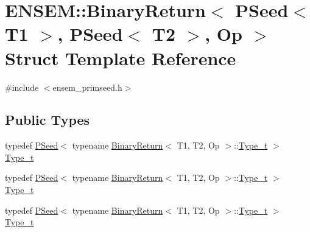 \hypertarget{structENSEM_1_1BinaryReturn_3_01PSeed_3_01T1_01_4_00_01PSeed_3_01T2_01_4_00_01Op_01_4}{}\section{E\+N\+S\+EM\+:\+:Binary\+Return$<$ P\+Seed$<$ T1 $>$, P\+Seed$<$ T2 $>$, Op $>$ Struct Template Reference}
\label{structENSEM_1_1BinaryReturn_3_01PSeed_3_01T1_01_4_00_01PSeed_3_01T2_01_4_00_01Op_01_4}


{\ttfamily \#include $<$ensem\+\_\+primseed.\+h$>$}

\subsection*{Public Types}
\begin{DoxyCompactItemize}
\item 
typedef \mbox{\hyperlink{classENSEM_1_1PSeed}{P\+Seed}}$<$ typename \mbox{\hyperlink{structENSEM_1_1BinaryReturn}{Binary\+Return}}$<$ T1, T2, Op $>$\+::\mbox{\hyperlink{structENSEM_1_1BinaryReturn_3_01PSeed_3_01T1_01_4_00_01PSeed_3_01T2_01_4_00_01Op_01_4_ae3a30c4b21f95d0ccf2ef57c02e76dcb}{Type\+\_\+t}} $>$ \mbox{\hyperlink{structENSEM_1_1BinaryReturn_3_01PSeed_3_01T1_01_4_00_01PSeed_3_01T2_01_4_00_01Op_01_4_ae3a30c4b21f95d0ccf2ef57c02e76dcb}{Type\+\_\+t}}
\item 
typedef \mbox{\hyperlink{classENSEM_1_1PSeed}{P\+Seed}}$<$ typename \mbox{\hyperlink{structENSEM_1_1BinaryReturn}{Binary\+Return}}$<$ T1, T2, Op $>$\+::\mbox{\hyperlink{structENSEM_1_1BinaryReturn_3_01PSeed_3_01T1_01_4_00_01PSeed_3_01T2_01_4_00_01Op_01_4_ae3a30c4b21f95d0ccf2ef57c02e76dcb}{Type\+\_\+t}} $>$ \mbox{\hyperlink{structENSEM_1_1BinaryReturn_3_01PSeed_3_01T1_01_4_00_01PSeed_3_01T2_01_4_00_01Op_01_4_ae3a30c4b21f95d0ccf2ef57c02e76dcb}{Type\+\_\+t}}
\item 
typedef \mbox{\hyperlink{classENSEM_1_1PSeed}{P\+Seed}}$<$ typename \mbox{\hyperlink{structENSEM_1_1BinaryReturn}{Binary\+Return}}$<$ T1, T2, Op $>$\+::\mbox{\hyperlink{structENSEM_1_1BinaryReturn_3_01PSeed_3_01T1_01_4_00_01PSeed_3_01T2_01_4_00_01Op_01_4_ae3a30c4b21f95d0ccf2ef57c02e76dcb}{Type\+\_\+t}} $>$ \mbox{\hyperlink{structENSEM_1_1BinaryReturn_3_01PSeed_3_01T1_01_4_00_01PSeed_3_01T2_01_4_00_01Op_01_4_ae3a30c4b21f95d0ccf2ef57c02e76dcb}{Type\+\_\+t}}
\end{DoxyCompactItemize}


